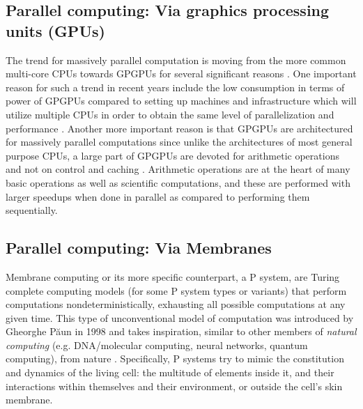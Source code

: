 \documentclass{acm_proc_article-sp}
\begin{document}
\subsection{Parallel computing: Via graphics processing units (GPUs)}
The trend for massively parallel computation is moving from the more common multi-core CPUs towards GPGPUs for several significant reasons \cite{cudabook}\cite{cudaguide}. One important reason for such a trend in recent years include the low consumption in terms of power of GPGPUs compared to setting up machines and infrastructure which will utilize multiple CPUs in order to obtain the same level of parallelization and performance \cite{cudapage}. Another more important reason is that GPGPUs are architectured for massively parallel computations since unlike the architectures of most general purpose CPUs, a large part of GPGPUs are devoted for arithmetic operations and not on control and caching \cite{cudabook}\cite{cudaguide}. Arithmetic operations are at the heart of many basic operations as well as scientific computations, and these are performed with larger speedups when done in parallel as compared to performing them sequentially. 

\subsection{Parallel computing: Via Membranes}
Membrane computing or its more specific counterpart, a P system, are Turing complete computing models (for some P system types or variants) that perform computations nondeterministically, exhausting all possible  computations at any given time. This type of unconventional model of computation was introduced by Gheorghe P\u aun in 1998 and takes inspiration, similar to other members of {\it natural computing} (e.g. DNA/molecular computing, neural networks, quantum computing), from nature \cite{introtomem}\cite{ppage}. Specifically, P systems try to mimic the constitution and dynamics of the living cell: the multitude of elements inside it, and their interactions within themselves and their environment, or outside the cell's skin membrane.

\end{document}
